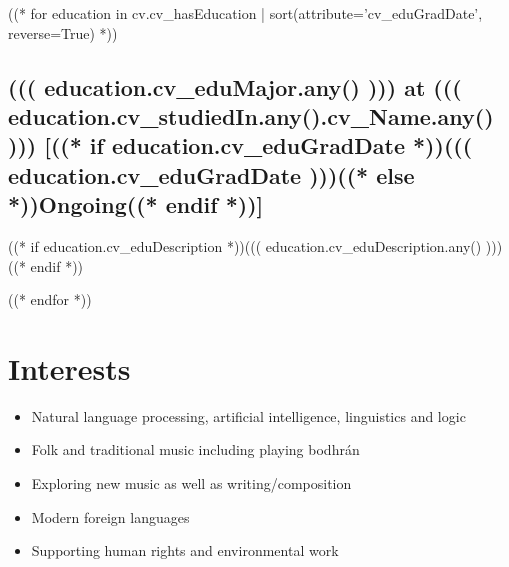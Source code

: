 \documentclass[10pt]{article}
\begin{document}
((* for education in cv.cv_hasEducation | sort(attribute='cv_eduGradDate', reverse=True) *))

\subsection*{((( education.cv_eduMajor.any() ))) at ((( education.cv_studiedIn.any().cv_Name.any() ))) [((* if education.cv_eduGradDate *))((( education.cv_eduGradDate )))((* else *))Ongoing((* endif *))]}

((* if education.cv_eduDescription *))((( education.cv_eduDescription.any() )))((* endif *))

((* endfor *))


\section*{Interests}
\begin{itemize}

\item
Natural language processing, artificial intelligence, linguistics and logic
\item
Folk and traditional music including playing bodhr\'{a}n
\item
Exploring new music as well as writing/composition
\item
Modern foreign languages
\item
Supporting human rights and environmental work


\end{itemize}
\end{document}
